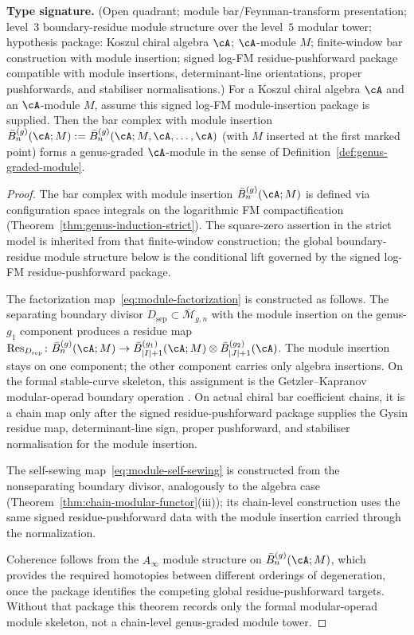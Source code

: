 \begin{theorem}\label{thm:module-genus-tower}
\textbf{Type signature.} (Open quadrant; module bar/Feynman-transform
presentation; level~$3$ boundary-residue module structure over the
level~$5$ modular tower; hypothesis package: Koszul chiral algebra
$\cA$; $\cA$-module $M$; finite-window bar construction with module
insertion; signed log-FM residue-pushforward package compatible with
module insertions, determinant-line orientations, proper pushforwards,
and stabiliser normalisations.)
For a Koszul chiral algebra $\cA$ and an $\cA$-module $M$, assume this
signed log-FM module-insertion package is supplied. Then the
bar complex with module insertion
$\bar{B}^{(g)}_n(\cA; M) :=
\bar{B}^{(g)}_n(\cA; M, \cA, \ldots, \cA)$
\textup{(}with $M$ inserted at the first marked
point\textup{)} forms a genus-graded $\cA$-module in the sense
of Definition~\textup{\ref{def:genus-graded-module}}.
\end{theorem}

\begin{proof}
The bar complex with module insertion
$\bar{B}^{(g)}_n(\cA; M)$ is defined via configuration space
integrals on the logarithmic FM compactification
(Theorem~\ref{thm:genus-induction-strict}). The square-zero assertion
in the strict model is inherited from that finite-window construction;
the global boundary-residue module structure below is the conditional
lift governed by the signed log-FM residue-pushforward package.

The factorization map~\eqref{eq:module-factorization} is
constructed as follows. The separating boundary divisor
$D_{\mathrm{sep}} \subset \overline{\mathcal{M}}_{g,n}$ with
the module insertion on the genus-$g_1$ component produces a
residue map
$\mathrm{Res}_{D_{\mathrm{sep}}}\colon
\bar{B}^{(g)}_n(\cA; M) \to
\bar{B}^{(g_1)}_{|I|+1}(\cA; M) \otimes
\bar{B}^{(g_2)}_{|J|+1}(\cA)$.
The module insertion stays on one component; the other component
carries only algebra insertions. On the formal stable-curve skeleton,
this assignment is the Getzler--Kapranov modular-operad boundary
operation \cite{GeK98}.  On actual chiral bar coefficient chains, it is
a chain map only after the signed residue-pushforward package supplies
the Gysin residue map, determinant-line sign, proper pushforward, and
stabiliser normalisation for the module insertion.

The self-sewing map~\eqref{eq:module-self-sewing} is constructed
from the nonseparating boundary divisor, analogously to the
algebra case (Theorem~\ref{thm:chain-modular-functor}(iii)); its
chain-level construction uses the same signed residue-pushforward data
with the module insertion carried through the normalization.

Coherence follows from the $A_\infty$ module structure on
$\bar{B}^{(g)}_n(\cA; M)$, which provides the required
homotopies between different orderings of degeneration, once the
package identifies the competing global residue-pushforward targets.
Without that package this theorem records only the formal modular-operad
module skeleton, not a chain-level genus-graded module tower.
\end{proof}

